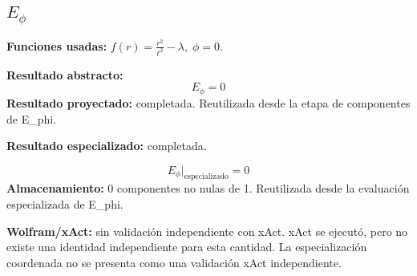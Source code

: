 \documentclass[11pt]{article}
\begin{document}
\subsection*{$ E_{\phi} $}
\textbf{Funciones usadas:} $ f\!\left(r\right) = \frac{{r}^{2}}{{\ell}^{2}} - \lambda,\;\phi=0 $.\par
\textbf{Resultado abstracto:}
\begin{dmath*}[breakdepth={5}]
E_{\phi} = 0
\end{dmath*}
\textbf{Resultado proyectado:} completada. Reutilizada desde la etapa de componentes de E\_phi.\par
\textbf{Resultado especializado:} completada.\par
\begin{dmath*}[breakdepth={5}]
E_{\phi}\big|_{\mathrm{especializado}} = 0
\end{dmath*}
\textbf{Almacenamiento:} 0 componentes no nulas de 1. Reutilizada desde la evaluación especializada de E\_phi.\par
\textbf{Wolfram/xAct:} sin validación independiente con xAct. xAct se ejecutó, pero no existe una identidad independiente para esta cantidad. La especialización coordenada no se presenta como una validación xAct independiente.\par\medskip
{}
\end{document}
